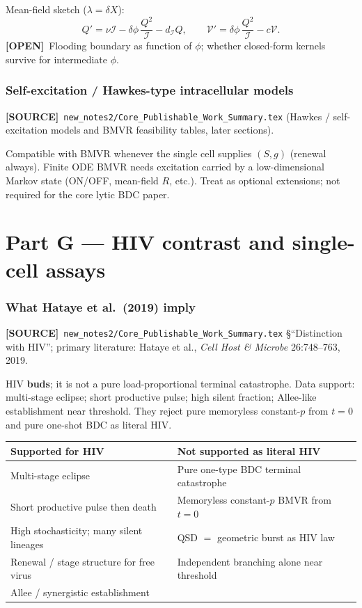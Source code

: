 \documentclass[11pt,a4paper]{article}
\newcommand{\Icell}{\mathcal{I}}
\newcommand{\Vfree}{\mathcal{V}}
\theoremstyle{plain}
\theoremstyle{definition}
\theoremstyle{remark}
\newcommand{\OPEN}{\textcolor{red!55!black}{\textbf{[OPEN]}}}
\newcommand{\SOURCE}{\textcolor{gray!50!black}{\textbf{[SOURCE]}}}
\begin{document}
Mean-field sketch ($\lambda=\delta X$):
\[
Q'=\nu\Icell-\delta\phi\,\frac{Q^2}{\Icell}-d_{\Icell}Q,\qquad
\Vfree'=\delta\phi\,\frac{Q^2}{\Icell}-c\Vfree.
\]
\OPEN\ Flooding boundary as function of $\phi$; whether closed-form kernels
survive for intermediate $\phi$.

\section{Self-excitation / Hawkes-type intracellular models}
\SOURCE\
\texttt{new\_notes2/Core\_Publishable\_Work\_Summary.tex}
(Hawkes / self-excitation models and BMVR feasibility tables, later sections).

Compatible with BMVR whenever the single cell supplies $(S,g)$ (renewal always).
Finite ODE BMVR needs excitation carried by a low-dimensional Markov state
(ON/OFF, mean-field $R$, etc.). Treat as optional extensions; not required for
the core lytic BDC paper.

\part*{Part G --- HIV contrast and single-cell assays}

\section{What Hataye et al.\ (2019) imply}
\label{sec:hiv}
\SOURCE\
\texttt{new\_notes2/Core\_Publishable\_Work\_Summary.tex}
\S``Distinction with HIV'';
primary literature: Hataye et al., \textit{Cell Host \& Microbe} 26:748--763, 2019.

HIV \textbf{buds}; it is not a pure load-proportional terminal catastrophe.
Data support: multi-stage eclipse; short productive pulse; high silent fraction;
Allee-like establishment near threshold. They reject pure memoryless constant-$p$
from $t=0$ and pure one-shot BDC as literal HIV.

\begin{center}
\renewcommand{\arraystretch}{1.2}
\begin{tabular}{@{}p{}p{}@{}}
\toprule
Supported for HIV & Not supported as literal HIV \\
\midrule
Multi-stage eclipse & Pure one-type BDC terminal catastrophe \\
Short productive pulse then death & Memoryless constant-$p$ BMVR from $t=0$ \\
High stochasticity; many silent lineages & QSD $=$ geometric burst as HIV law \\
Renewal / stage structure for free virus & Independent branching alone near threshold \\
Allee / synergistic establishment & \\
\bottomrule
\end{tabular}
\end{center}
\end{document}
